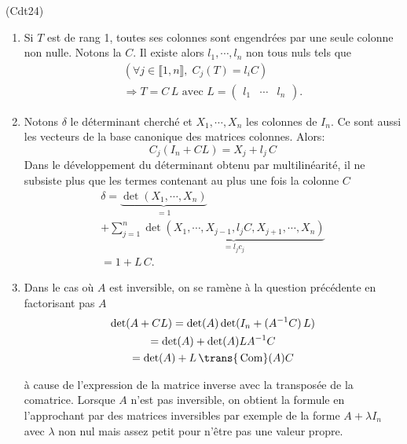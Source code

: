 \begin{tiny}(Cdt24)\end{tiny}
\begin{enumerate}
 \item Si $T$ est de rang 1, toutes ses colonnes sont engendrées par une seule colonne non nulle. Notons la $C$. Il existe alors $l_1, \cdots, l_n$ non tous nuls tels que
 \begin{multline*}
  \left( \forall j \in \llbracket 1,n \rrbracket, \; C_j(T) = l_iC\right) \\ 
  \Rightarrow
  T = C \,L\text{ avec } 
  L =
  \begin{pmatrix}
   l_1 & \cdots & l_n
  \end{pmatrix}.
 \end{multline*}

 \item Notons $\delta$ le déterminant cherché et $X_1, \cdots, X_n$ les colonnes de $I_n$. Ce sont aussi les vecteurs de la base canonique des matrices colonnes. Alors:
 \[
  C_j(I_n + CL) = X_j + l_j\,C
 \]
Dans le développement du déterminant obtenu par multilinéarité, il ne subsiste plus que les termes contenant au plus une fois la colonne $C$
\begin{multline*}
 \delta = \underset{=1}{\underbrace{\det(X_1,\cdots,X_n)}} \\
 + \sum_{j=1}^{n}\underset{ = l_j c_j}{\underbrace{\det(X_1,\cdots,X_{j-1},l_jC,X_{j+1},\cdots,X_n)}}\\
 = 1 + L\,C.
\end{multline*}

 \item Dans le cas où $A$ est inversible, on se ramène à la question précédente en factorisant pas $A$
\begin{multline*}
 \det(A + CL) = \det(A)\det(I_n + (A^{-1}C)\,L)\\
 = \det(A) + \det(A)LA^{-1}C\\
 = \det(A) + L\, \trans{\,\mathop{\mathrm{Com }}}(A) C
\end{multline*}

à cause de l'expression de la matrice inverse avec la transposée de la comatrice.\newline
Lorsque $A$ n'est pas inversible, on obtient la formule en l'approchant par des matrices inversibles par exemple de la forme $A + \lambda I_n$ avec $\lambda$ non nul mais assez petit pour n'être pas une valeur propre.
\end{enumerate}
